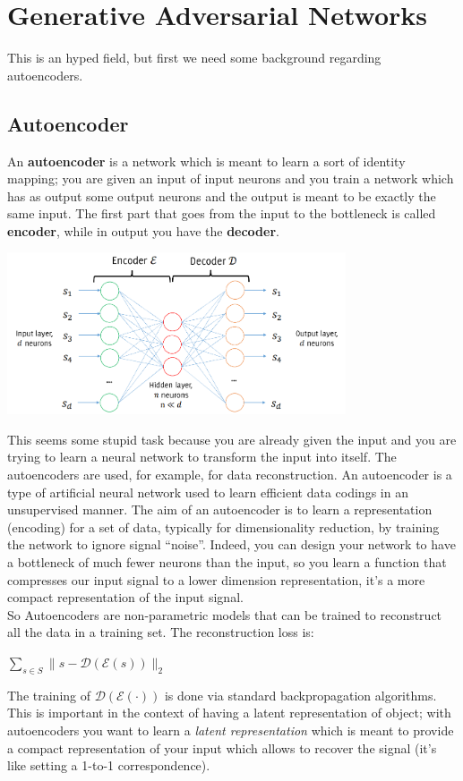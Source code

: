 \section{Generative Adversarial Networks}
This is an hyped field, but first we need some background regarding autoencoders.

\subsection{Autoencoder}
An \textbf{autoencoder} is a network which is meant to learn a sort of identity mapping; you are given an input of input neurons and you train a network which has as output some output neurons and the output is meant to be exactly the same input. The first part that goes from the input to the bottleneck is called \textbf{encoder}, while in output you have the \textbf{decoder}.  
\begin{center}
    \includegraphics[width=0.75\textwidth]{images/autoencoder.PNG}\par
\end{center}
This seems some stupid task because you are already given the input and you are trying to learn a neural network to transform the input into itself. The autoencoders are used, for example, for data reconstruction. An autoencoder is a type of artificial neural network used to learn efficient data codings in an unsupervised manner. The aim of an autoencoder is to learn a representation (encoding) for a set of data, typically for dimensionality reduction, by training the network to ignore signal “noise”. Indeed, you can design your network to have a bottleneck of much fewer neurons than the input, so you learn a function that compresses our input signal to a lower dimension representation, it's a more compact representation of the input signal. \\
So Autoencoders are non-parametric models that can be trained to reconstruct all the data in a training set. The reconstruction loss is:
\begin{center}
    $\sum_{s \in S}\|s-\mathcal{D}(\mathcal{E}(s))\|_{2}$
\end{center}
The training of $\mathcal{D}(\mathcal{E}(\cdot))$ is done via standard backpropagation algorithms. This is important in the context of having a latent representation of object; with autoencoders you want to learn a \textit{latent representation} which is meant to provide a compact representation of your input which allows to recover the signal (it's like setting a 1-to-1 correspondence).

